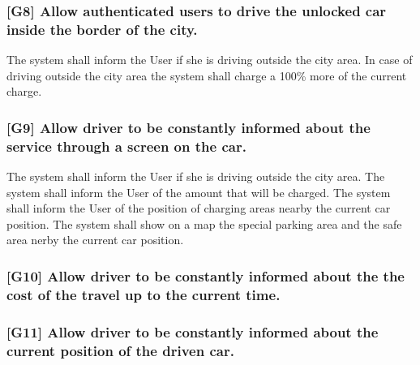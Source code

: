\subsubsection{{[}G8{]} Allow authenticated users to drive the unlocked car inside the border of the city.}
\begin{itemize}
	\reqcounter The system shall inform the User if she is driving outside the city area.
	\reqcounter In case of driving outside the city area the system shall charge a 100\%  more of the current charge.
\end{itemize}



\subsubsection{{[}G9{]} Allow driver to be constantly informed about the service through a screen on the car.}

\begin{itemize}
	\reqcounter The system shall inform the User if she is driving outside the city area.
	\reqcounter The system shall inform the User of the amount that will be charged.
	\reqcounter The system shall inform the User of the position of charging areas nearby the current car position.
	\reqcounter The system shall show on a map the special parking area and the safe area nerby the current car position.
\end{itemize}

\subsubsection{{[}G10{]} Allow driver to be constantly informed about the the cost of the
	travel up to the current time.}

\subsubsection{{[}G11{]} Allow driver to be constantly informed about the current position
	of the driven car.}


